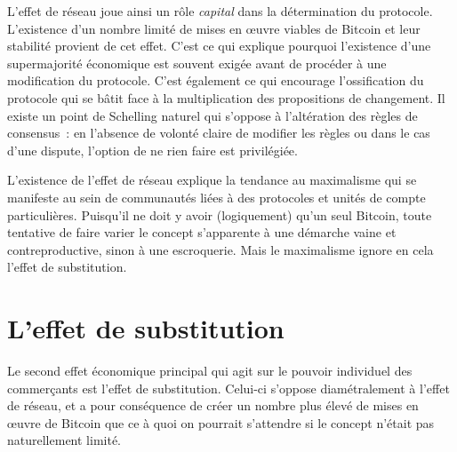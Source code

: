 L'effet de réseau joue ainsi un rôle \emph{capital} dans la détermination du protocole. L'existence d'un nombre limité de mises en œuvre viables de Bitcoin et leur stabilité provient de cet effet. C'est ce qui explique pourquoi l'existence d'une supermajorité économique est souvent exigée avant de procéder à une modification du protocole. C'est également ce qui encourage l'ossification du protocole qui se bâtit face à la multiplication des propositions de changement. Il existe un point de Schelling naturel qui s'oppose à l'altération des règles de consensus~: en l'absence de volonté claire de modifier les règles ou dans le cas d'une dispute, l'option de ne rien faire est privilégiée. %

L'existence de l'effet de réseau explique la tendance au maximalisme qui se manifeste au sein de communautés liées à des protocoles et unités de compte particulières. Puisqu'il ne doit y avoir (logiquement) qu'un seul Bitcoin, toute tentative de faire varier le concept s'apparente à une démarche vaine et contreproductive, sinon à une escroquerie. Mais le maximalisme ignore en cela l'effet de substitution.

\section*{L'effet de substitution}

Le second effet économique principal qui agit sur le pouvoir individuel des commerçants est l'effet de substitution. Celui-ci s'oppose diamétralement à l'effet de réseau, et a pour conséquence de créer un nombre plus élevé de mises en œuvre de Bitcoin que ce à quoi on pourrait s'attendre si le concept n'était pas naturellement limité.

